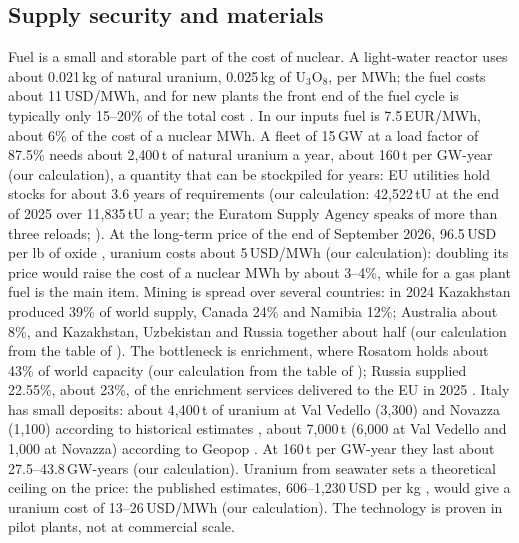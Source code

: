 \subsection{Supply security and materials}\label{sec:supply}
Fuel is a small and storable part of the cost of nuclear. A light-water reactor uses about 0.021\,kg of natural uranium, 0.025\,kg of U$_3$O$_8$, per MWh; the fuel costs about 11\,USD/MWh, and for new plants the front end of the fuel cycle is typically only 15--20\% of the total cost \citep{WNAEconomics}. In our inputs fuel is 7.5\,EUR/MWh, about 6\% of the cost of a nuclear MWh. A fleet of 15\,GW at a load factor of 87.5\% needs about 2{,}400\,t of natural uranium a year, about 160\,t per GW-year (our calculation), a quantity that can be stockpiled for years: EU utilities hold stocks for about 3.6 years of requirements (our calculation: 42{,}522\,tU at the end of 2025 over 11{,}835\,tU a year; the Euratom Supply Agency speaks of more than three reloads; \citealp{ESA2025}). At the long-term price of the end of September 2026, 96.5\,USD per lb of oxide \citep{Cameco2026}, uranium costs about 5\,USD/MWh (our calculation): doubling its price would raise the cost of a nuclear MWh by about 3--4\%, while for a gas plant fuel is the main item. Mining is spread over several countries: in 2024 Kazakhstan produced 39\% of world supply, Canada 24\% and Namibia 12\%; Australia about 8\%, and Kazakhstan, Uzbekistan and Russia together about half (our calculation from the table of \citealp{WNAMining}). The bottleneck is enrichment, where Rosatom holds about 43\% of world capacity (our calculation from the table of \citealp{WNAEnrichment}); Russia supplied 22.55\%, about 23\%, of the enrichment services delivered to the EU in 2025 \citep{ESA2025}. Italy has small deposits: about 4{,}400\,t of uranium at Val Vedello (3{,}300) and Novazza (1{,}100) according to historical estimates \citep{WISEUranium2026}, about 7{,}000\,t (6{,}000 at Val Vedello and 1{,}000 at Novazza) according to Geopop \citep{Geopop2026}. At 160\,t per GW-year they last about 27.5--43.8\,GW-years (our calculation). Uranium from seawater sets a theoretical ceiling on the price: the published estimates, 606--1{,}230\,USD per kg \citep{Schneider2014,Schneider2013}, would give a uranium cost of 13--26\,USD/MWh (our calculation). The technology is proven in pilot plants, not at commercial scale.

